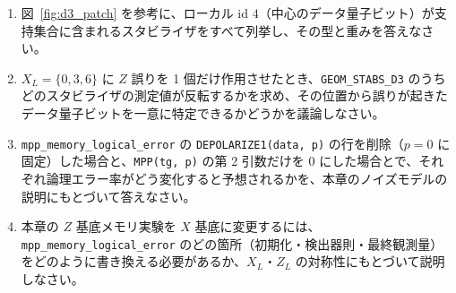 \begin{exercise}
  \begin{enumerate}
    \item 図~\ref{fig:d3_patch} を参考に、ローカル id $4$（中心のデータ量子ビット）が支持集合に含まれるスタビライザをすべて列挙し、その型と重みを答えなさい。
    \item $X_L=\{0,3,6\}$ に $Z$ 誤りを 1 個だけ作用させたとき、\texttt{GEOM\_STABS\_D3} のうちどのスタビライザの測定値が反転するかを求め、その位置から誤りが起きたデータ量子ビットを一意に特定できるかどうかを議論しなさい。
    \item \texttt{mpp\_memory\_logical\_error} の \texttt{DEPOLARIZE1(data, p)} の行を削除（$p=0$ に固定）した場合と、\texttt{MPP(tg, p)} の第 2 引数だけを $0$ にした場合とで、それぞれ論理エラー率がどう変化すると予想されるかを、本章のノイズモデルの説明にもとづいて答えなさい。
    \item 本章の $Z$ 基底メモリ実験を $X$ 基底に変更するには、\texttt{mpp\_memory\_logical\_error} のどの箇所（初期化・検出器則・最終観測量）をどのように書き換える必要があるか、$X_L$・$Z_L$ の対称性にもとづいて説明しなさい。
  \end{enumerate}
\end{exercise}
